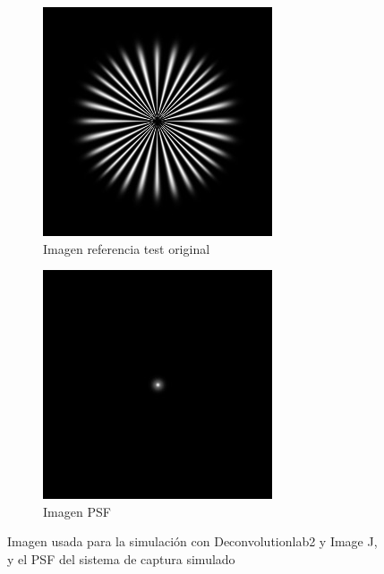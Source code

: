 \documentclass{./packages/optica-article}
\begin{document}
\begin{figure}[hbp]
	\centering
	\begin{subfigure}[t]{0.45\textwidth}\centering
		\centering
		\includegraphics[width=\textwidth]{Simulation deconvolution/ref.jpg}
		\caption{Imagen referencia test original}\label{fig:ref}
	\end{subfigure}
	\hfill
	\begin{subfigure}[t]{0.45\textwidth}\centering
		\includegraphics[width=\textwidth]{Simulation deconvolution/psf.jpg}
		\caption{Imagen PSF}\label{fig:psf}
	\end{subfigure}
	\caption{Imagen usada para la simulación con Deconvolutionlab2 y Image J, y el PSF del sistema de captura simulado}\label{fig:image:ref-psf}
\end{figure}
\end{document}
